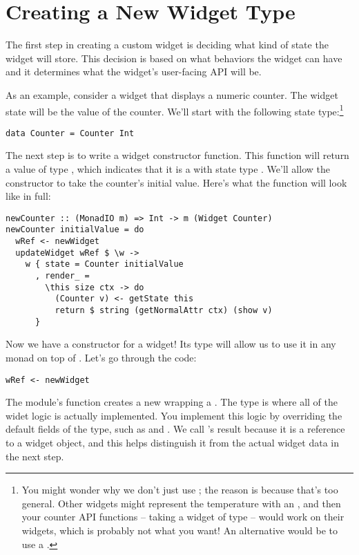 \section{Creating a New Widget Type}

The first step in creating a custom widget is deciding what kind of
state the widget will store.  This decision is based on what behaviors
the widget can have and it determines what the widget's user-facing
API will be.

As an example, consider a widget that displays a numeric counter.  The
widget state will be the value of the counter.  We'll start with the
following state type:\footnote{You might wonder why we don't just use
  ; the reason is because that's too general.  Other widgets
  might represent the temperature with an , and then your
  counter API functions -- taking a widget of type  --
  would work on their widgets, which is probably not what you want!
  An alternative would be to use a .}

\begin{verbatim}
data Counter = Counter Int
\end{verbatim}

The next step is to write a widget constructor function.  This
function will return a value of type , which
indicates that it is a  with state type .
We'll allow the constructor to take the counter's initial value.
Here's what the function will look like in full:

\begin{verbatim}
newCounter :: (MonadIO m) => Int -> m (Widget Counter)
newCounter initialValue = do
  wRef <- newWidget
  updateWidget wRef $ \w ->
    w { state = Counter initialValue
      , render_ =
        \this size ctx -> do
          (Counter v) <- getState this
          return $ string (getNormalAttr ctx) (show v)
      }
\end{verbatim}

Now we have a constructor for a  widget!  Its type will
allow us to use it in any monad on top of .  Let's go through
the code:

\begin{verbatim}
wRef <- newWidget
\end{verbatim}

The  module's  function creates a new
 wrapping a .  The  type is
where all of the widet logic is actually implemented.  You implement
this logic by overriding the default fields of the 
type, such as  and .  We call 's
result  because it is a reference to a widget object, and
this helps distinguish it from the actual widget data in the next
step.

